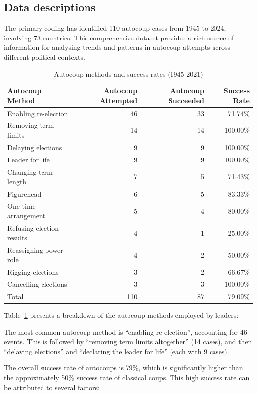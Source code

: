 \documentclass[
  12pt,
]{report}
\begin{document}
\subsection{Data descriptions}\label{data-descriptions}

The primary coding has identified 110 autocoup cases from 1945 to 2024,
involving 73 countries. This comprehensive dataset provides a rich
source of information for analysing trends and patterns in autocoup
attempts across different political contexts.

\begin{longtable}[]{@{}lrrr@{}}

\caption{\label{tbl-autocoup_method}Autocoup methods and success rates
(1945-2021)}

\tabularnewline

\toprule\noalign{}
Autocoup Method & Autocoup Attempted & Autocoup Succeeded & Success
Rate \\
\midrule\noalign{}
\endhead
\bottomrule\noalign{}
\endlastfoot
Enabling re-election & 46 & 33 & 71.74\% \\
Removing term limits & 14 & 14 & 100.00\% \\
Delaying elections & 9 & 9 & 100.00\% \\
Leader for life & 9 & 9 & 100.00\% \\
Changing term length & 7 & 5 & 71.43\% \\
Figurehead & 6 & 5 & 83.33\% \\
One-time arrangement & 5 & 4 & 80.00\% \\
Refusing election results & 4 & 1 & 25.00\% \\
Reassigning power role & 4 & 2 & 50.00\% \\
Rigging elections & 3 & 2 & 66.67\% \\
Cancelling elections & 3 & 3 & 100.00\% \\
Total & 110 & 87 & 79.09\% \\

\end{longtable}

Table~\ref{tbl-autocoup_method} presents a breakdown of the autocoup
methods employed by leaders:

The most common autocoup method is ``enabling re-election'', accounting
for 46 events. This is followed by ``removing term limits altogether''
(14 cases), and then ``delaying elections'' and ``declaring the leader
for life'' (each with 9 cases).

The overall success rate of autocoups is 79\%, which is significantly
higher than the approximately 50\% success rate of classical coups. This
high success rate can be attributed to several factors:
\end{document}
